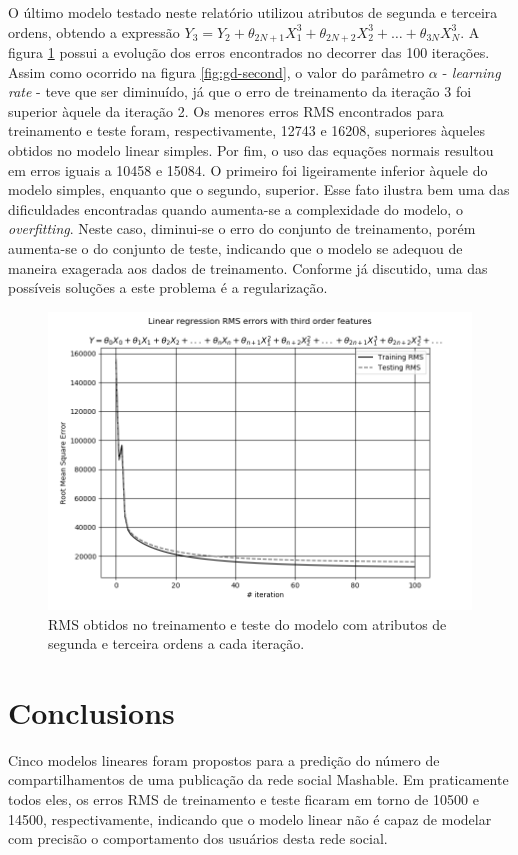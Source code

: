 \documentclass[10pt,twocolumn,letterpaper]{article}
\begin{document}
O último modelo testado neste relatório utilizou atributos de segunda e terceira ordens, obtendo a expressão \(Y_3 = Y_2 + \theta_{2N+1}X_1^3 + \theta_{2N+2}X_2^3 + \ldots + \theta_{3N}X_N^3\). A figura \ref{fig:gd-third} possui a evolução dos erros encontrados no decorrer das 100 iterações. Assim como ocorrido na figura \ref{fig:gd-second}, o valor do parâmetro \(\alpha\) - \textit{learning rate} - teve que ser diminuído, já que o erro de treinamento da iteração 3 foi superior àquele da iteração 2. Os menores erros RMS encontrados para treinamento e teste foram, respectivamente, 12743 e 16208, superiores àqueles obtidos no modelo linear simples. Por fim, o uso das equações normais resultou em erros iguais a 10458 e 15084. O primeiro foi ligeiramente inferior àquele do modelo simples, enquanto que o segundo, superior. Esse fato ilustra bem uma das dificuldades encontradas quando aumenta-se a complexidade do modelo, o \textit{overfitting}. Neste caso, diminui-se o erro do conjunto de treinamento, porém aumenta-se o do conjunto de teste, indicando que o modelo se adequou de maneira exagerada aos dados de treinamento. Conforme já discutido, uma das possíveis soluções a este problema é a regularização.

\begin{figure}
    \centering
    \includegraphics[width=0.9\columnwidth]{img/lr-third-gd.png}
    \caption{RMS obtidos no treinamento e teste do modelo com atributos de segunda e terceira ordens a cada iteração.}
    \label{fig:gd-third}
\end{figure}

\section{Conclusions}

Cinco modelos lineares foram propostos para a predição do número de compartilhamentos de uma publicação da rede social Mashable. Em praticamente todos eles, os erros RMS de treinamento e teste ficaram em torno de 10500 e 14500, respectivamente, indicando que o modelo linear não é capaz de modelar com precisão o comportamento dos usuários desta rede social. 

{\small


}
\end{document}

